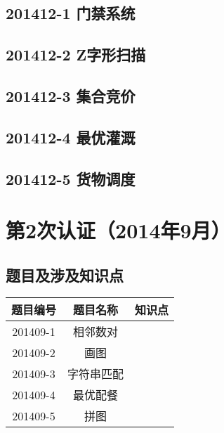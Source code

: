 \documentclass[cn,10pt,math=newtx,citestyle=gb7714-2015,bibstyle=gb7714-2015]{elegantbook}
\newif\ifonlyanalyze %
\begin{document}
\newpage
\section{201412-1 门禁系统}
\ifonlyanalyze
\else
    
\fi


\newpage
\section{201412-2 Z字形扫描}
\ifonlyanalyze
\else
    
\fi


\newpage
\section{201412-3 集合竞价}
\ifonlyanalyze
\else
    
\fi


\newpage
\section{201412-4 最优灌溉}
\ifonlyanalyze
\else
    
\fi


\newpage
\section{201412-5 货物调度}
\ifonlyanalyze
\else
    
\fi



\chapter{第2次认证（2014年9月）}

\section{题目及涉及知识点}

\begin{table}[htbp]
    \centering
    \begin{tabular}{ccc}
        \toprule
        题目编号 & 题目名称   & 知识点 \\
        \midrule
        201409-1 & 相邻数对   &        \\
        201409-2 & 画图       &        \\
        201409-3 & 字符串匹配 &        \\
        201409-4 & 最优配餐   &        \\
        201409-5 & 拼图       &        \\
        \bottomrule
    \end{tabular}
\end{table}
\end{document}
